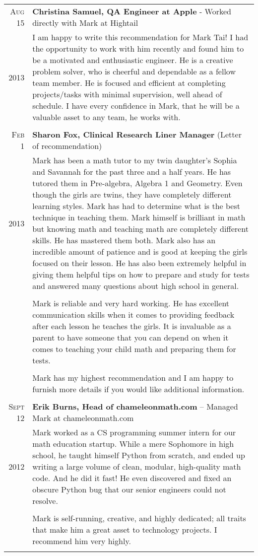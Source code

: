 \documentclass[a4paper,10pt]{article}
\begin{document}
\begin{tabular}{r|p{15cm}}
 \textsc{Aug 15} & \textbf{Christina Samuel, QA Engineer at Apple} - Worked directly with Mark at Hightail\\ 
 \textsc{2013} & I am happy to write this recommendation for Mark Tai! I had the opportunity to work with him recently and found him to be a motivated and enthusiastic engineer. He is a creative problem solver, who is cheerful and dependable as a fellow team member. He is focused and efficient at completing projects/tasks with minimal supervision, well ahead of schedule. I have every confidence in Mark, that he will be a valuable asset to any team, he works with. \\
 \multicolumn{2}{c}{} \\
 
 \textsc{Feb 1} & \textbf{Sharon Fox, Clinical Research Liner Manager} (Letter of recommendation)\\ 
 \textsc{2013} & Mark has been a math tutor to my twin daughter’s Sophia and Savannah for the past three and a half years. He has tutored them in Pre-algebra, Algebra 1 and Geometry. Even though the girls are twins, they have completely different learning styles. Mark has had to determine what is the best technique in teaching them. Mark himself is brilliant in math but knowing math and teaching math are completely different skills. He has mastered them both. Mark also has an incredible amount of patience and is good at keeping the girls focused on their lesson. He has also been extremely helpful in giving them helpful tips on how to prepare and study for tests and answered many questions about high school in general. \\ \\
 & Mark is reliable and very hard working. He has excellent communication skills when it comes to providing feedback after each lesson he teaches the girls. It is invaluable as a parent to have someone that you can depend on when it comes to teaching your child math and preparing them for tests.\\ \\
 & Mark has my highest recommendation and I am happy to furnish more details if you would like additional information. \\
 \multicolumn{2}{c}{} \\
 
 \textsc{Sept 12} & \textbf{Erik Burns, Head of chameleonmath.com} – Managed Mark at chameleonmath.com\\ 
 \textsc{2012} & Mark worked as a CS programming summer intern for our math education startup. While a mere Sophomore in high school, he taught himself Python from scratch, and ended up writing a large volume of clean, modular, high-quality math code. And he did it fast! He even discovered and fixed an obscure Python bug that our senior engineers could not resolve. \\ \\
 & Mark is self-running, creative, and highly dedicated; all traits that make him a great asset to technology projects. I recommend him very highly. \\
 \multicolumn{2}{c}{} \\
 
\end{tabular}


\end{document}
